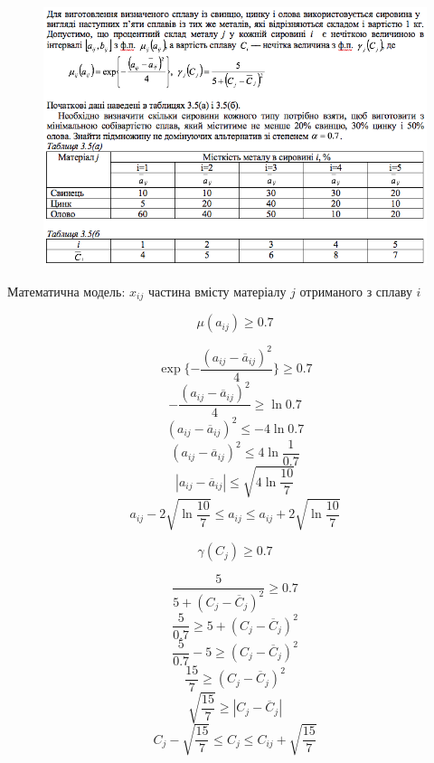 \begin{center}
  \normalsize{}
\end{center}


\begin{figure}[h!]
  \centering
  \includegraphics[width=13cm]{3_5.png}
  \centering
\end{figure}


Математична модель: $x_{ij}$ частина вмісту матеріалу $j$  отриманого з сплаву $i$

\begin{multicols}{2}

  $$\mu(a_{ij}) \geqslant 0.7  $$

  $$ \exp\{ - \dfrac{(a_{ij}-\overline{a}_{ij})^2}{4} \} \geqslant 0.7 $$
  $$- \dfrac{(a_{ij}-\overline{a}_{ij})^2}{4} \geqslant \ln{0.7} $$
  $$ (a_{ij}-\overline{a}_{ij})^2 \leqslant -4 \ln{0.7} $$
  $$ (a_{ij}-\overline{a}_{ij})^2 \leqslant 4 \ln{\dfrac{1}{0.7}} $$
  $$|a_{ij}-\overline{a}_{ij}| \leqslant  \sqrt{4\ln{\dfrac{10}{7}}} $$
  $$ a_{ij} - 2 \sqrt{\ln{\dfrac{10}{7}}} \leqslant a_{ij} \leqslant a_{ij} + 2 \sqrt{ \ln{\dfrac{10}{7}}}$$

  \columnbreak

  $$\gamma(C_{j}) \geqslant 0.7 $$

  $$ \dfrac{5}{5+(C_{j}-\overline{C}_{j})^2} \geqslant 0.7 $$
  $$ \dfrac{5}{0.7} \geqslant 5+(C_{j}-\overline{C}_{j})^2 $$
  $$ \dfrac{5}{0.7}- 5 \geqslant (C_{j}-\overline{C}_{j})^2$$
  $$ \dfrac{15}{7} \geqslant (C_{j}-\overline{C}_{j})^2$$
  $$ \sqrt{\dfrac{15}{7}} \geqslant |C_{j}-\overline{C}_{j}|$$
  $$C_{j} - \sqrt{\dfrac{15}{7}} \leqslant C_{j} \leqslant C_{ij} + \sqrt{\dfrac{15}{7}}$$

\end{multicols}




